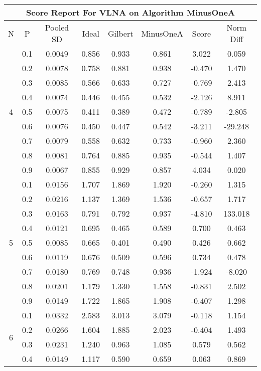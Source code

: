 \documentclass[11pt,a4paper]{report}
\begin{document}
\begin{longtable}{ | c | c || c | c | c | c | c | c | }
\hline
\multicolumn{8}{|c|}{ Score Report For VLNA on Algorithm MinusOneA} \\
\hline
N & P & Pooled SD &  Ideal &  Gilbert & MinusOneA  & Score & Norm Diff \\
 \hline
 \hline
 \endhead
\multirow{9}{*}{4} & 0.1 & 0.0049 & 0.856 & 0.933 & 0.861 & 3.022 & 0.059 \\
 & 0.2 & 0.0078 & 0.758 & 0.881 & 0.938 & -0.470 & 1.470 \\
 & 0.3 & 0.0085 & 0.566 & 0.633 & 0.727 & -0.769 & 2.413 \\
 & 0.4 & 0.0074 & 0.446 & 0.455 & 0.532 & -2.126 & 8.911 \\
 & 0.5 & 0.0075 & 0.411 & 0.389 & 0.472 & -0.789 & -2.805 \\
 & 0.6 & 0.0076 & 0.450 & 0.447 & 0.542 & -3.211 & -29.248 \\
 & 0.7 & 0.0079 & 0.558 & 0.632 & 0.733 & -0.960 & 2.360 \\
 & 0.8 & 0.0081 & 0.764 & 0.885 & 0.935 & -0.544 & 1.407 \\
 & 0.9 & 0.0067 & 0.855 & 0.929 & 0.857 & 4.034 & 0.020 \\
 \hline
\multirow{9}{*}{5} & 0.1 & 0.0156 & 1.707 & 1.869 & 1.920 & -0.260 & 1.315 \\
 & 0.2 & 0.0216 & 1.137 & 1.369 & 1.536 & -0.657 & 1.717 \\
 & 0.3 & 0.0163 & 0.791 & 0.792 & 0.937 & -4.810 & 133.018 \\
 & 0.4 & 0.0121 & 0.695 & 0.465 & 0.589 & 0.700 & 0.463 \\
 & 0.5 & 0.0085 & 0.665 & 0.401 & 0.490 & 0.426 & 0.662 \\
 & 0.6 & 0.0119 & 0.676 & 0.509 & 0.596 & 0.734 & 0.478 \\
 & 0.7 & 0.0180 & 0.769 & 0.748 & 0.936 & -1.924 & -8.020 \\
 & 0.8 & 0.0201 & 1.179 & 1.330 & 1.558 & -0.831 & 2.502 \\
 & 0.9 & 0.0149 & 1.722 & 1.865 & 1.908 & -0.407 & 1.298 \\
 \hline
\multirow{9}{*}{6} & 0.1 & 0.0332 & 2.583 & 3.013 & 3.079 & -0.118 & 1.154 \\
 & 0.2 & 0.0266 & 1.604 & 1.885 & 2.023 & -0.404 & 1.493 \\
 & 0.3 & 0.0231 & 1.240 & 0.963 & 1.085 & 0.579 & 0.562 \\
 & 0.4 & 0.0149 & 1.117 & 0.590 & 0.659 & 0.063 & 0.869 \\

\end{longtable}
\end{document}
